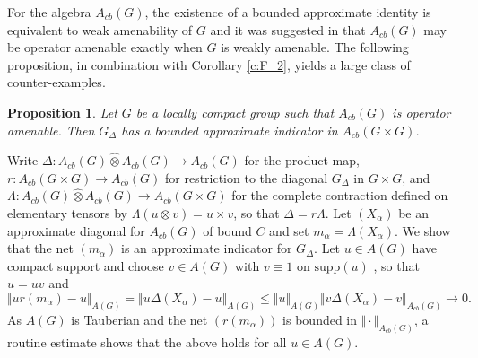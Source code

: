 \documentclass[preprint,12pt]{elsarticle}
\newtheorem{prop}[thm]{Proposition}
\begin{document}
For the algebra $A_{cb}(G)$, the existence
of a bounded approximate identity is equivalent to weak amenability
of $G$ \cite{Fo} and it was suggested in \cite{FRS} that $A_{cb}(G)$
may be operator amenable exactly when $G$ is weakly amenable. The
following proposition, in combination with Corollary \ref{c:F_2},
yields a large class of counter-examples.
\begin{prop}
Let $G$ be a locally compact group such that $A_{cb}(G)$
is operator amenable. Then $G_{\Delta}$ has
a bounded approximate indicator in $A_{cb}(G\times G)$.\end{prop}
\begin{pf}
Write $\Delta:A_{cb}(G)\widehat{\otimes}A_{cb}(G)\rightarrow A_{cb}(G)$
for the product map, $r:A_{cb}(G\times G)\rightarrow A_{cb}(G)$
for restriction to the diagonal $G_{\Delta}$ in $G\times G$, and
$\Lambda:A_{cb}(G)\widehat{\otimes}A_{cb}(G)\rightarrow A_{cb}(G\times G)$
for the complete contraction defined on elementary tensors by $\Lambda(u\otimes v)=u\times v$,
so that $\Delta=r\Lambda$. Let $(X_{\alpha})$ be an approximate
diagonal for $A_{cb}(G)$ of bound $C$ and set $m_{\alpha}=\Lambda(X_{\alpha})$.
We show that the net $(m_{\alpha})$ is an approximate
indicator for $G_{\Delta}$. Let $u\in A(G)$ have compact
support and choose $v\in A(G)$ with $v\equiv1$ on $\mbox{supp}(u)$
\cite[Lemme 3.2]{E}, so that $u=uv$ and \[
\Vert ur(m_{\alpha})-u\Vert _{A(G)}=\Vert u\Delta(X_{\alpha})-u\Vert _{A(G)}\leq\Vert u\Vert _{A(G)}\Vert v\Delta(X_{\alpha})-v\Vert _{A_{cb}(G)}\rightarrow0.\]
As $A(G)$ is Tauberian and the net $(r(m_{\alpha}))$
is bounded in $\Vert \cdot\Vert _{A_{cb}(G)}$,
a routine estimate shows that the above holds for all $u\in A(G)$.


\end{pf}
\end{document}
